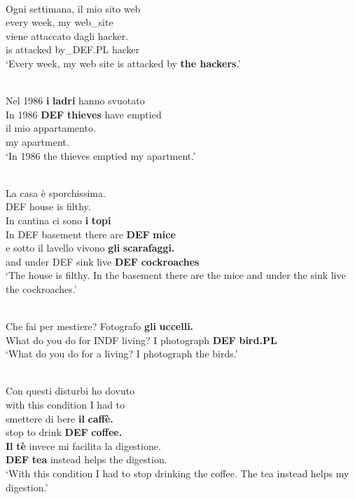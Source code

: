 \ea \label{} 
\\
\gll Ogni  settimana,  il mio  sito web\\
every  week,  my  web\_site\\
\gll viene  attaccato  dagli  hacker.\\
is  attacked  by\_DEF.PL  hacker\\
\glt ‘Every week, my web site is attacked by \textbf{the hackers}.’

\z

\ea \label{} 
\\
\gll Nel  1986  \textbf{i} \textbf{ladri} hanno  svuotato\\
In  1986  \textbf{DEF} \textbf{thieves} have  emptied\\
\gll il mio  appartamento.\\
my  apartment.\\
\glt ‘In 1986 the thieves emptied my apartment.’

\z

\ea \label{} 
\\
\gll La  casa  è  sporchissima.\\
DEF  house  is  filthy.\\
\gll In  cantina  ci  sono  \textbf{i} \textbf{topi}\\
In DEF  basement  there  are  \textbf{DEF} \textbf{mice}\\
\gll e  sotto  il  lavello  vivono  \textbf{gli} \textbf{scarafaggi.}\\
and  under  DEF  sink  live  \textbf{DEF} \textbf{cockroaches}\\
\glt ‘The house is filthy. In the basement there are the mice and under the sink live the cockroaches.’  

\z

\ea \label{} 
\\
\gll Che  fai  per  mestiere?  Fotografo  \textbf{gli} \textbf{  uccelli.}\\
What do you  do  for  INDF living?  I photograph  \textbf{DEF} \textbf{bird.PL}\\
\glt ‘What do you do for a living? I photograph the birds.’

\z

\ea \label{} 
\\
\gll Con  questi  disturbi  ho  dovuto\\
with  this  condition  I  had to\\
\gll smettere  di  bere  \textbf{il} \textbf{caffè.} \\
stop  to  drink  \textbf{DEF} \textbf{coffee.}\\
\gll \textbf{Il} \textbf{tè} invece  mi facilita  la digestione.\\
\textbf{DEF} \textbf{tea} instead  helps  the digestion.\\
\glt ‘With this condition I had to stop drinking the coffee. The tea instead helps my digestion.’

